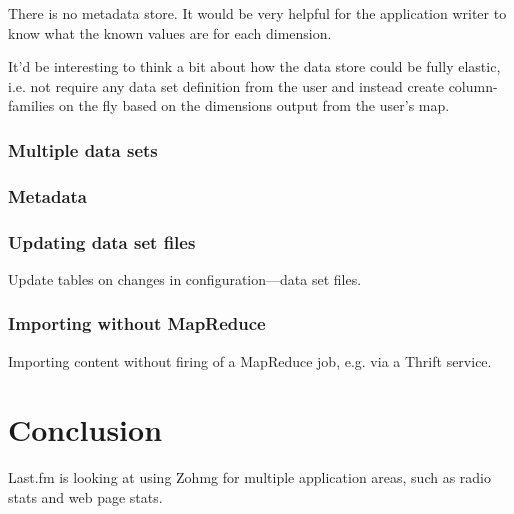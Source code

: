 \documentclass[a4paper,10pt]{book}
\begin{document}
There is no metadata store. It would be very helpful for the application writer to know what the known values are for each dimension.

It'd be interesting to think a bit about how the data store could be fully elastic, i.e. not require any data set definition from the user and instead create column-families on the fly based on the dimensions output from the user's map.

\subsection{Multiple data sets}

\subsection{Metadata}

\subsection{Updating data set files}

Update tables on changes in configuration---data set files.

\subsection{Importing without MapReduce}

Importing content without firing of a MapReduce job, e.g. via a Thrift
service.



\chapter{Conclusion}

Last.fm is looking at using Zohmg for multiple application areas, such as
radio stats and web page stats.


\pagebreak



 
\end{document}
